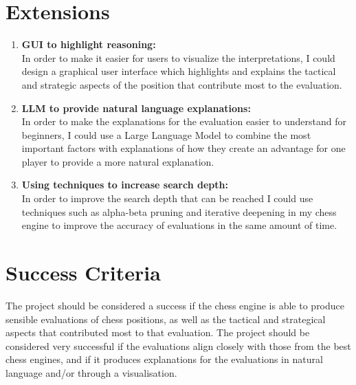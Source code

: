 \documentclass[12pt,a4paper]{article}
\begin{document}
\section*{Extensions}
\begin{enumerate}
    \item \textbf{GUI to highlight reasoning:}
    \\In order to make it easier for users to visualize the interpretations, I could design a graphical user interface which highlights and explains the tactical and strategic aspects of the position that contribute most to the evaluation.
    \item \textbf{LLM to provide natural language explanations:}
    \\In order to make the explanations for the evaluation easier to understand for beginners, I could use a Large Language Model to combine the most important factors with explanations of how they create an advantage for one player to provide a more natural explanation.
    \item \textbf{Using techniques to increase search depth:}
    \\In order to improve the search depth that can be reached I could use techniques such as alpha-beta pruning and iterative deepening in my chess engine to improve the accuracy of evaluations in the same amount of time.
\end{enumerate}



\section*{Success Criteria}
The project should be considered a success if the chess engine is able to produce sensible evaluations of chess positions, as well as the tactical and strategical aspects that contributed most to that evaluation. The project should be considered very successful if the evaluations align closely with those from the best chess engines, and if it produces explanations for the evaluations in natural language and/or through a visualisation.
\end{document}
